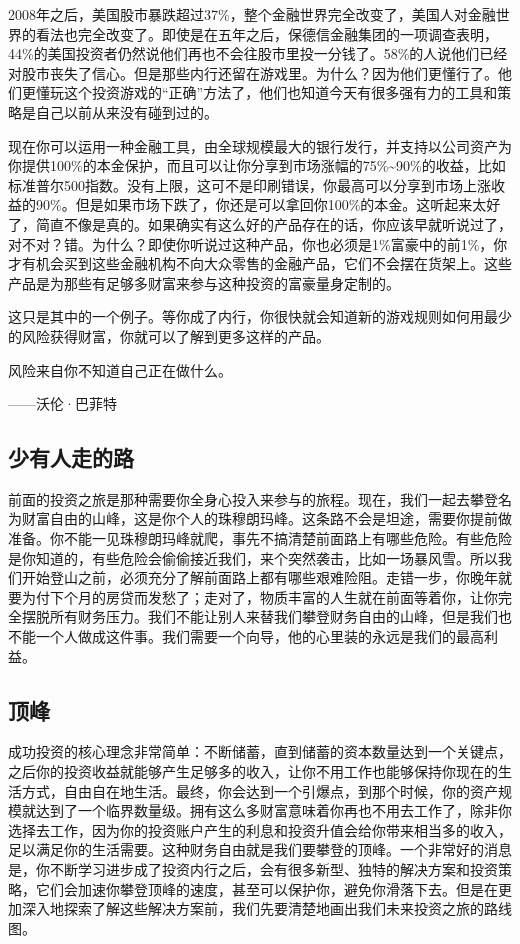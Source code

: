 2008年之后，美国股市暴跌超过37\%，整个金融世界完全改变了，美国人对金融世界的看法也完全改变了。即使是在五年之后，保德信金融集团的一项调查表明，44\%的美国投资者仍然说他们再也不会往股市里投一分钱了。58\%的人说他们已经对股市丧失了信心。但是那些内行还留在游戏里。为什么？因为他们更懂行了。他们更懂玩这个投资游戏的“正确”方法了，他们也知道今天有很多强有力的工具和策略是自己以前从来没有碰到过的。

现在你可以运用一种金融工具，由全球规模最大的银行发行，并支持以公司资产为你提供100\%的本金保护，而且可以让你分享到市场涨幅的75\%\textasciitilde{}90\%的收益，比如标准普尔500指数。没有上限，这可不是印刷错误，你最高可以分享到市场上涨收益的90\%。但是如果市场下跌了，你还是可以拿回你100\%的本金。这听起来太好了，简直不像是真的。如果确实有这么好的产品存在的话，你应该早就听说过了，对不对？错。为什么？即使你听说过这种产品，你也必须是1\%富豪中的前1\%，你才有机会买到这些金融机构不向大众零售的金融产品，它们不会摆在货架上。这些产品是为那些有足够多财富来参与这种投资的富豪量身定制的。

这只是其中的一个例子。等你成了内行，你很快就会知道新的游戏规则如何用最少的风险获得财富，你就可以了解到更多这样的产品。

\begin{BookQuote}
风险来自你不知道自己正在做什么。

\hfill ——沃伦·巴菲特
\end{BookQuote}

\subsection{少有人走的路}

前面的投资之旅是那种需要你全身心投入来参与的旅程。现在，我们一起去攀登名为财富自由的山峰，这是你个人的珠穆朗玛峰。这条路不会是坦途，需要你提前做准备。你不能一见珠穆朗玛峰就爬，事先不搞清楚前面路上有哪些危险。有些危险是你知道的，有些危险会偷偷接近我们，来个突然袭击，比如一场暴风雪。所以我们开始登山之前，必须充分了解前面路上都有哪些艰难险阻。走错一步，你晚年就要为付下个月的房贷而发愁了；走对了，物质丰富的人生就在前面等着你，让你完全摆脱所有财务压力。我们不能让别人来替我们攀登财务自由的山峰，但是我们也不能一个人做成这件事。我们需要一个向导，他的心里装的永远是我们的最高利益。

\subsection{顶峰}

成功投资的核心理念非常简单：不断储蓄，直到储蓄的资本数量达到一个关键点，之后你的投资收益就能够产生足够多的收入，让你不用工作也能够保持你现在的生活方式，自由自在地生活。最终，你会达到一个引爆点，到那个时候，你的资产规模就达到了一个临界数量级。拥有这么多财富意味着你再也不用去工作了，除非你选择去工作，因为你的投资账户产生的利息和投资升值会给你带来相当多的收入，足以满足你的生活需要。这种财务自由就是我们要攀登的顶峰。一个非常好的消息是，你不断学习进步成了投资内行之后，会有很多新型、独特的解决方案和投资策略，它们会加速你攀登顶峰的速度，甚至可以保护你，避免你滑落下去。但是在更加深入地探索了解这些解决方案前，我们先要清楚地画出我们未来投资之旅的路线图。

